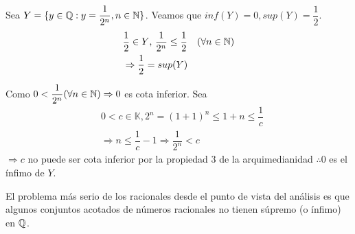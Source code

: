 \clearpage

\begin{eg}
    Sea $Y = \{ y \in \mathbb{Q} : y=\dfrac{1}{2^n}, n\in \mathbb{N} \}$. Veamos que $inf(Y) =0, sup(Y) = \dfrac{1}{2}$.
    \begin{align*}
         & \dfrac{1}{2} \in Y \text{, } \dfrac{1}{2^n} \leq \dfrac{1}{2} \quad (\forall n \in \mathbb{N}) \\
         & \Rightarrow \dfrac{1}{2} = sup(Y)
    \end{align*}

    Como $0 < \dfrac{1}{2^n} (\forall n \in \mathbb{N}) \Rightarrow 0$ es cota inferior.
    Sea \begin{align*}
         & 0 < c \in \mathbb{K}, 2^n = (1+1)^n \leq 1+n \leq \dfrac{1}{c}     \\
         & \Rightarrow n \leq \dfrac{1}{c} - 1 \Rightarrow \dfrac{1}{2^n} < c
    \end{align*}
    $\Rightarrow c$ no puede ser cota inferior por la propiedad 3 de la arquimedianidad $\therefore 0$ es el ínfimo de $Y$.
\end{eg}

El problema más serio de los racionales desde el punto de vista del análisis es que algunos conjuntos acotados de números racionales no tienen súpremo (o ínfimo) en $\mathbb{Q}$.

